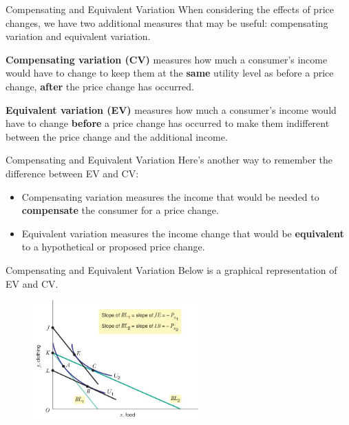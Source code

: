 \documentclass[12pt,t]{beamer}
\begin{document}
\begin{frame}{Compensating and Equivalent Variation}
  When considering the effects of price changes, we have two additional measures that may be useful: compensating variation and equivalent variation.

  \pause\bigskip
  \textbf{Compensating variation (CV)} measures how much a consumer's income would have to change to keep them at the \textbf{same} utility level as before a price change, \textbf{after} the price change has occurred.
  
  \pause\bigskip
  \textbf{Equivalent variation (EV)} measures how much a consumer's income would have to change \textbf{before} a price change has occurred to make them indifferent between the price change and the additional income.
\end{frame}

\begin{frame}{Compensating and Equivalent Variation}
  Here's another way to remember the difference between EV and CV:
  
  \bigskip
  \begin{itemize}
    \item Compensating variation measures the income that would be needed to \textbf{compensate} the consumer for a price change.

    \item Equivalent variation measures the income change that would be \textbf{equivalent} to a hypothetical or proposed price change.
  \end{itemize}
\end{frame}

\begin{frame}{Compensating and Equivalent Variation}
  Below is a graphical representation of EV and CV.
  \begin{figure}
    \includegraphics[width=240px]{figures/fig5_15.jpg}
  \end{figure}
\end{frame}
\end{document}
